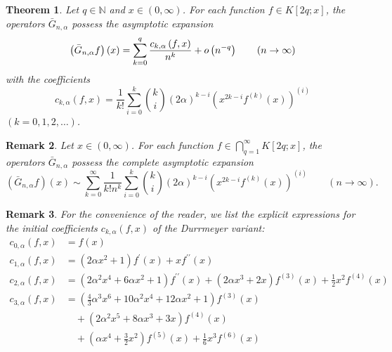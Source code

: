 \documentclass[10pt,a4paper]{amsart}
\newtheorem{theorem}{Theorem}
\newtheorem{remark}[theorem]{Remark}
\begin{document}
\begin{theorem}
\label{theorem-expansion}Let $q\in \mathbb{N}$ and $x\in \left( 0,\infty
\right) $. For each function $f\in K\left[ 2q;x\right] $, the operators $%
\bar{G}_{n,\alpha }$ possess the asymptotic expansion 
\begin{equation}
\left( \bar{G}_{n,\alpha }f\right) \left( x\right) =\sum_{k=0}^{q}\frac{%
c_{k,\alpha }\left( f,x\right) }{n^{k}}+o\left( n^{-q}\right) \qquad \left(
n\rightarrow \infty \right)  \label{complete-asympt-expansion-in-theorem}
\end{equation}%
with the coefficients 
\begin{equation}
c_{k,\alpha }\left( f,x\right) =\frac{1}{k!}\sum_{i=0}^{k}\binom{k}{i}\left(
2\alpha \right) ^{k-i}\left( x^{2k-i}f^{\left( k\right) }\left( x\right)
\right) ^{\left( i\right) }  \label{coeff-c}
\end{equation}%
$\left( k=0,1,2,\ldots \right) $.
\end{theorem}


\begin{remark}
Let $x\in \left( 0,\infty \right) $. For each function $f\in
\bigcap_{q=1}^{\infty }K\left[ 2q;x\right] $, the operators $\bar{G}%
_{n,\alpha }$ possess the complete asymptotic expansion 
\begin{equation*}
\left( \bar{G}_{n,\alpha }f\right) \left( x\right) \sim \sum_{k=0}^{\infty }%
\frac{1}{k!n^{k}}\sum_{i=0}^{k}\binom{k}{i}\left( 2\alpha \right)
^{k-i}\left( x^{2k-i}f^{\left( k\right) }\left( x\right) \right) ^{\left(
i\right) }\qquad \left( n\rightarrow \infty \right) .
\end{equation*}
\end{remark}

\begin{remark}
For the convenience of the reader, we list the explicit expressions for the
initial coefficients $c_{k,\alpha }\left( f,x\right) $ of the Durrmeyer
variant: 
\begin{align*}
c_{0,\alpha }\left( f,x\right) & =f(x) \\[0.5em]
c_{1,\alpha }\left( f,x\right) & =\left( 2\alpha x^{2}+1\right) f^{\prime
}(x)+xf^{\prime \prime }(x) \\[0.5em]
c_{2,\alpha }\left( f,x\right) & =\left( 2\alpha ^{2}x^{4}+6\alpha
x^{2}+1\right) f^{\prime \prime }(x)+\left( 2\alpha x^{3}+2x\right)
f^{(3)}(x)+\frac{1}{2}x^{2}f^{(4)}(x) \\[0.5em]
c_{3,\alpha }\left( f,x\right) & =\left( \frac{4}{3}\alpha
^{3}x^{6}+10\alpha ^{2}x^{4}+12\alpha x^{2}+1\right) f^{(3)}(x) \\
& \quad +\left( 2\alpha ^{2}x^{5}+8\alpha x^{3}+3x\right) f^{(4)}(x) \\
& \quad +\left( \alpha x^{4}+\frac{3}{2}x^{2}\right) f^{(5)}(x)+\frac{1}{6}%
x^{3}f^{(6)}(x)
\end{align*}
\end{remark}
\end{document}
